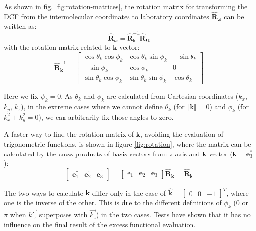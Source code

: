 As shown in fig. \ref{fig:rotation-matrices}, the rotation matrix
for transforming the DCF from the intermolecular coordinates to laboratory
coordinates $\mathbf{\hat{R}}_{\boldsymbol{\omega}}$ can be written
as:
\begin{equation}
\mathbf{\hat{R}}_{\boldsymbol{\omega}}=\mathbf{\hat{R}}_{\mathbf{k}}^{-1}\mathbf{\hat{R}}_{\mathbf{\Omega}}\label{eq:rot-matrix}
\end{equation}
with the rotation matrix related to $\mathbf{k}$ vector:
\begin{equation}
\mathbf{\hat{R}}_{\mathbf{k}}^{-1}=\left[\begin{array}{ccc}
\cos\theta_{k}\cos\phi_{k} & \cos\theta_{k}\sin\phi_{k} & -\sin\theta_{k}\\
-\sin\phi_{k} & \cos\phi_{k} & 0\\
\sin\theta_{k}\cos\phi_{k} & \sin\theta_{k}\sin\phi_{k} & \cos\theta_{k}
\end{array}\right]
\end{equation}

Here we fix $\psi_{k}=0$. As $\theta_{k}$ and $\phi_{k}$ are calculated
from Cartesian coordinates ($k_{x}$, $k_{y}$, $k_{z}$), in the
extreme cases where we cannot define $\theta_{k}$ (for $\left\Vert \mathbf{k}\right\Vert =0$)
and $\phi_{k}$ (for $k_{x}^{2}+k_{y}^{2}=0$), we can arbitrarily
fix those angles to zero.

A faster way to find the rotation matrix of $\mathbf{k}$, avoiding
the evaluation of trigonometric functions, is shown in figure \ref{fig:rotation},
where the matrix can be calculated by the cross products of basis
vectors from $z$ axis and $\mathbf{k}$ vector ($\mathbf{k}=\mathbf{e}_{3}^{''}$):
\begin{equation}
\left[\begin{array}{ccc}
\mathbf{e}_{1}^{''} & \mathbf{e}_{2}^{'} & \mathbf{e}_{3}^{''}\end{array}\right]=\left[\begin{array}{ccc}
\mathbf{e}_{1} & \mathbf{e}_{2} & \mathbf{e}_{3}\end{array}\right]\mathbf{\hat{R}_{k}}=\mathbf{\hat{R}_{k}}
\end{equation}

The two ways to calculate $\mathbf{k}$ differ only in the case of
$\hat{\mathbf{k}}=\left[\begin{array}{ccc}
0 & 0 & -1\end{array}\right]^{T}$, where one is the inverse of the other. This is due to the different
definitions of $\phi_{k}$ ($0$ or $\pi$ when $\overrightarrow{k'_{z}}$
superposes with $\overrightarrow{k_{z}}$) in the two cases. Tests
have shown that it has no influence on the final result of the excess
functional evaluation.

